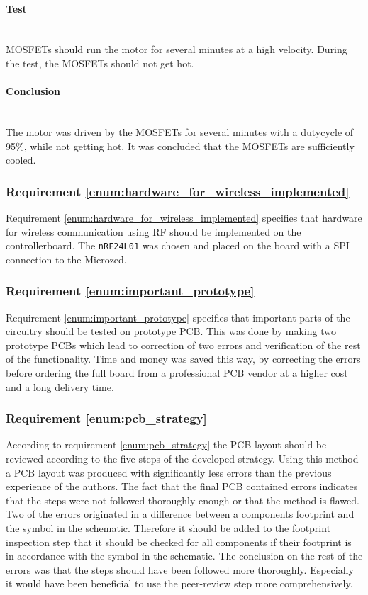 \paragraph{Test}~\\
MOSFETs should run the motor for several minutes at a high velocity. 
During the test, the MOSFETs should not get hot.

\paragraph{Conclusion}~\\
The motor was driven by the MOSFETs for several minutes with a dutycycle of 95\%, while not getting hot.
It was concluded that the MOSFETs are sufficiently cooled.

\subsubsection{Requirement \ref{enum:hardware_for_wireless_implemented}} %
\label{ssub:requirement_enum:hardware_for_wireless_implemented}
Requirement \ref{enum:hardware_for_wireless_implemented} specifies that hardware for wireless communication using RF should be implemented on the controllerboard.
The \texttt{nRF24L01} was chosen and placed on the board with a SPI connection to the Microzed.

\subsubsection{Requirement \ref{enum:important_prototype}} %
\label{ssub:requirement_enum:important_prototype}
Requirement \ref{enum:important_prototype} specifies that important parts of the circuitry should be tested on prototype PCB.
This was done by making two prototype PCBs which lead to correction of two errors and verification of the rest of the functionality.
Time and money was saved this way, by correcting the errors before ordering the full board from a professional PCB vendor at a higher cost and a long delivery time.


\subsubsection{Requirement \ref{enum:pcb_strategy}} %
\label{ssub:requirement_enum:pcb_strategy}
According to requirement \ref{enum:pcb_strategy} the PCB layout should be reviewed according to the five steps of the developed strategy.
Using this method a PCB layout was produced with significantly less errors than the previous experience of the authors.
The fact that the final PCB contained errors indicates that the steps were not followed thoroughly enough or that the method is flawed.
Two of the errors originated in a difference between a components footprint and the symbol in the schematic.
Therefore it should be added to the footprint inspection step that it should be checked for all components if their footprint is in accordance with the symbol in the schematic.
The conclusion on the rest of the errors was that the steps should have been followed more thoroughly.
Especially it would have been beneficial to use the peer-review step more comprehensively.

